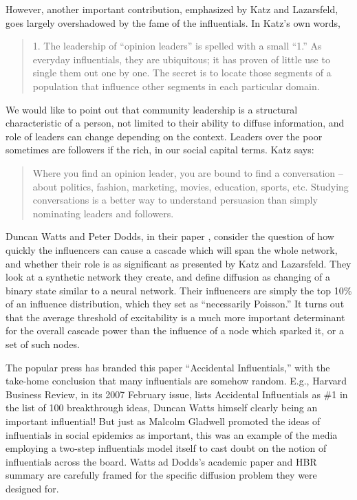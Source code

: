 \documentclass[10pt,oneside]{memoir}
\begin{document}
However, another important contribution, emphasized by Katz and Lazarsfeld, goes largely overshadowed by the fame of the influentials.  In Katz's own words,


\begin{quote}
1. The leadership of ``opinion leaders'' is spelled with a small ``1.''  As everyday influentials, they are ubiquitous; it has proven of little use to single them out one by one.  The secret is to locate those segments of a population that influence other segments in each particular domain.
\end{quote}


We would like to point out that community leadership is a structural characteristic of a person, not limited to their ability to diffuse information, and role of leaders can change depending on the context.  Leaders over the poor sometimes are followers if the rich, in our social capital terms.  Katz says:


\begin{quote}
Where you find an opinion leader, you are bound to find a conversation -- about politics, fashion, marketing, movies, education, sports, etc.  Studying conversations is a better way to understand persuasion than simply nominating leaders and followers.
\end{quote}


Duncan Watts and Peter Dodds, in their paper \cite{watts2007influentials}, consider the question of how quickly the influencers can cause a cascade which will span the whole network, and whether their role is as significant as presented by Katz and Lazarsfeld.  They look at a synthetic network they create, and define diffusion as changing of a binary state similar to a neural network.  Their influencers are simply the top 10\% of an influence distribution, which they set as ``necessarily Poisson.''  It turns out that the average threshold of excitability is a much more important determinant for the overall cascade power than the influence of a node which sparked it, or a set of such nodes.


The popular press has branded this paper ``Accidental Influentials,'' with the take-home conclusion that many influentials are somehow random.  E.g., Harvard Business Review, in its 2007 February issue, lists Accidental Influentials as \#1 in the list of 100 breakthrough ideas, Duncan Watts himself clearly being an important influential!  But just as Malcolm Gladwell promoted the ideas of influentials in social epidemics as important, this was an example of the media employing a two-step influentials model itself to cast doubt on the notion of influentials across the board.  Watts ad Dodds's academic paper and HBR summary are carefully framed for the specific diffusion problem they were designed for.
\end{document}
